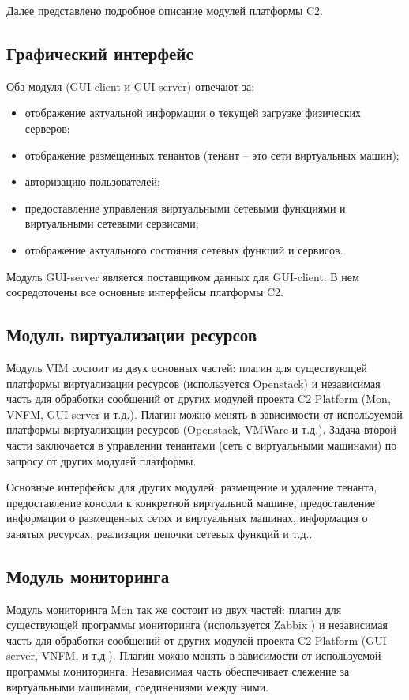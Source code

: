 \documentclass[oneside,final,14pt,a4paper]{extreport}
\begin{document}
Далее представлено подробное описание модулей платформы C2.

\subsection{Графический интерфейс}
Оба модуля (GUI-client и GUI-server) отвечают за:
\begin{itemize}
	\item отображение актуальной информации о текущей загрузке физических серверов;
	\item отображение размещенных тенантов (тенант -- это сети виртуальных машин);
	\item авторизацию пользователей;
	\item предоставление управления виртуальными сетевыми функциями и виртуальными сетевыми сервисами;
	\item отображение актуального состояния сетевых функций и сервисов.
\end{itemize}

Модуль GUI-server является поставщиком данных для GUI-client. В нем сосредоточены все основные интерфейсы платформы C2. 

\subsection{Модуль виртуализации ресурсов}
Модуль VIM состоит из двух основных частей: плагин для существующей платформы виртуализации ресурсов (используется Openstack) и независимая часть для обработки сообщений от других модулей проекта C2 Platform (Mon, VNFM, GUI-server и т.д.). Плагин можно менять в зависимости от используемой платформы виртуализации ресурсов (Openstack, VMWare и т.д.). Задача второй части заключается в управлении тенантами (сеть с виртуальными машинами) по запросу от других модулей платформы. 

Основные интерфейсы для других модулей: размещение и удаление тенанта, предоставление консоли к конкретной виртуальной машине, предоставление информации о размещенных сетях и виртуальных машинах, информация о занятых ресурсах, реализация цепочки сетевых функций и т.д..

\subsection{Модуль мониторинга}
Модуль мониторинга Mon так же состоит из двух частей: плагин для существующей программы мониторинга (используется Zabbix \cite{bib:zabbix}) и независимая часть для обработки сообщений от других модулей проекта C2 Platform (GUI-server, VNFM, и т.д.). Плагин можно менять в зависимости от используемой программы мониторинга. Независимая часть обеспечивает слежение за виртуальными машинами, соединениями между ними.
\end{document}
